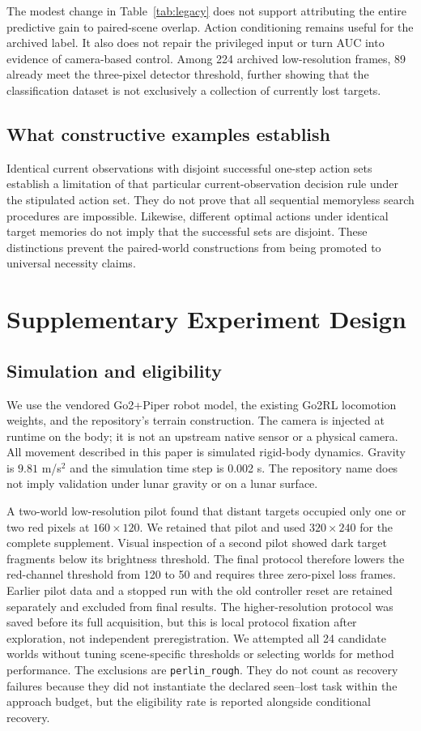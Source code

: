 \documentclass[10pt,twocolumn,a4paper]{article}
\begin{document}
The modest change in Table~\ref{tab:legacy} does not support attributing the entire predictive gain to paired-scene overlap. Action conditioning remains useful for the archived label. It also does not repair the privileged input or turn AUC into evidence of camera-based control. Among 224 archived low-resolution frames, 89 already meet the three-pixel detector threshold, further showing that the classification dataset is not exclusively a collection of currently lost targets.

\subsection{What constructive examples establish}
Identical current observations with disjoint successful one-step action sets establish a limitation of that particular current-observation decision rule under the stipulated action set. They do not prove that all sequential memoryless search procedures are impossible. Likewise, different optimal actions under identical target memories do not imply that the successful sets are disjoint. These distinctions prevent the paired-world constructions from being promoted to universal necessity claims.

\section{Supplementary Experiment Design}
\subsection{Simulation and eligibility}
We use the vendored Go2+Piper robot model, the existing Go2RL locomotion weights, and the repository's terrain construction. The camera is injected at runtime on the body; it is not an upstream native sensor or a physical camera. All movement described in this paper is simulated rigid-body dynamics. Gravity is $9.81$ m/s$^2$ and the simulation time step is 0.002 s. The repository name does not imply validation under lunar gravity or on a lunar surface.

A two-world low-resolution pilot found that distant targets occupied only one or two red pixels at $160\times120$. We retained that pilot and used $320\times240$ for the complete supplement. Visual inspection of a second pilot showed dark target fragments below its brightness threshold. The final protocol therefore lowers the red-channel threshold from 120 to 50 and requires three zero-pixel loss frames. Earlier pilot data and a stopped run with the old controller reset are retained separately and excluded from final results. The higher-resolution protocol was saved before its full acquisition, but this is local protocol fixation after exploration, not independent preregistration. We attempted all 24 candidate worlds without tuning scene-specific thresholds or selecting worlds for method performance. The exclusions are \texttt{perlin\_rough}. They do not count as recovery failures because they did not instantiate the declared seen--lost task within the approach budget, but the eligibility rate is reported alongside conditional recovery.
\end{document}
